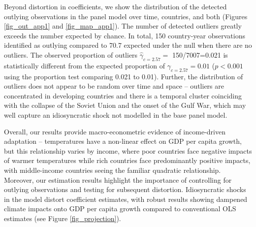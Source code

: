 \documentclass[11pt, letterpaper]{article}
\numberwithin{algorithm}{section}
\numberwithin{assumption}{section}
\numberwithin{lemma}{section}
\numberwithin{theorem}{section}
\numberwithin{corollary}{section}
\numberwithin{remark}{section}
\numberwithin{equation}{section}
\numberwithin{figure}{section}
\numberwithin{table}{section}
\newcommand{\ignore}[1]{}
\begin{document}
Beyond distortion in coefficients, we show the distribution of the detected outlying observations in the panel model over time, countries, and both (Figures \ref{fig_out_app1} and \ref{fig_map_app1}). The number of detected outliers greatly exceeds the number expected by chance. In total, 150 country-year observations identified as outlying compared to 70.7 expected under the null when there are no outliers. The observed proportion of outliers $\hat{\gamma}_{c=2.57}=$ 150/7007=0.021 is statistically different from the expected proportion of $\gamma_{c=2.57}=0.01$ ($p<0.001$ using the \citet{jiao2020testingoutlier}\ignore{Check this reference} proportion test comparing 0.021 to 0.01). Further, the distribution of outliers does not appear to be random over time and space -- outliers are concentrated in developing countries and there is a temporal cluster coinciding with the collapse of the Soviet Union and the onset of the Gulf War, which may well capture an idiosyncratic shock not modelled in the base panel model.

Overall, our results provide macro-econometric evidence of income-driven adaptation -- temperatures have a non-linear effect on GDP per capita growth, but this relationship varies by income, where poor countries face negative impacts of warmer temperatures while rich countries face predominantly positive impacts, with middle-income countries seeing the familiar quadratic relationship. Moreover, our estimation results highlight the importance of controlling for outlying observations and testing for subsequent distortion. Idiosyncratic shocks in the model distort coefficient estimates, with robust results showing dampened climate impacts onto GDP per capita growth compared to conventional OLS estimates (see Figure \ref{fig_projection}).

\ignore{CHECK}
\ignore{Note: Can we show that our residuals produced by IIS are iid normal or at least satisfy either normal, homoscedasticity, or serially independent? Any one of these will help us to defend our paper if referees criticise on our assumptions. In addition, in this case we have a very well specified climate impact model that can pass all the specification tests.}



\end{document}
